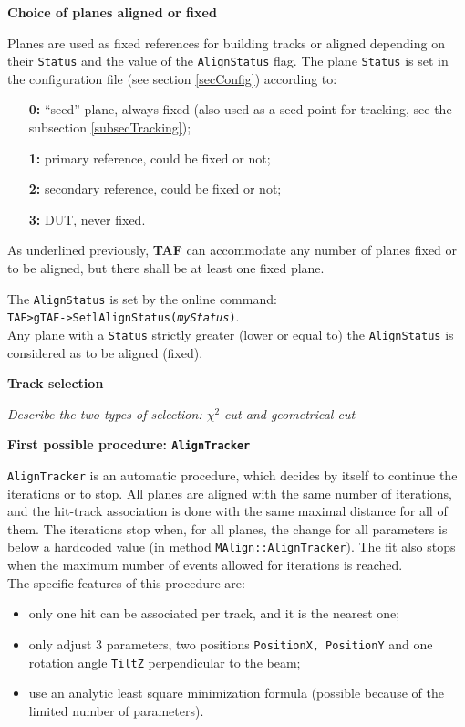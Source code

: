 \documentclass[a4paper, 12pt, twoside]{article}
\newcommand{\TAF}{{\bf TAF }}
\begin{document}
\vspace{0.8 cm}

\noindent
{\bf Choice of planes aligned or fixed}

\noindent
Planes are used as fixed references for building tracks or aligned depending on their {\tt Status} and the value of the {\tt AlignStatus} flag. The plane {\tt Status} is set in the configuration file (see section \ref{secConfig}) according to:
\begin{itemize}
\item[{\bf 0:}] ``seed'' plane, always fixed (also used as a seed point for tracking, see the subsection \ref{subsecTracking});
\item[{\bf 1:}]  primary reference, could be fixed or not;
\item[{\bf 2:}]  secondary reference, could be fixed or not;
\item[{\bf 3:}]  DUT, never fixed.
\end{itemize}
As underlined previously, \TAF  can accommodate any number of planes fixed or to be aligned, but there shall be at least one fixed plane.

\noindent
The {\tt AlignStatus} is set by the online command:\\
{\tt TAF>gTAF->SetlAlignStatus({\it myStatus})}.\\
Any plane with a {\tt Status} strictly greater (lower or equal to) the {\tt AlignStatus} is considered as to be aligned (fixed).


\vspace{0.8 cm}

\noindent
{\bf Track selection}

{\it Describe the two types of selection: $\chi^{2}$ cut and geometrical cut}
 

\noindent\vspace{0.8 cm}

\noindent
{\bf First possible procedure: {\tt AlignTracker}}

\noindent
{\tt AlignTracker} is an automatic procedure, which decides by itself to continue the iterations or to stop. All planes are aligned with the same number of iterations, and the hit-track association is done with the same maximal distance for all of them. The iterations stop when, for all planes, the change for all parameters is below a hardcoded value (in method {\tt MAlign::AlignTracker}). The fit also stops when the maximum number of events allowed for iterations is reached.\\
The specific features of this procedure are:
\begin{itemize}
\item only one hit can be associated per track, and it is the nearest one;
\item only adjust 3 parameters, two positions {\tt PositionX, PositionY} and one rotation angle {\tt TiltZ} perpendicular to the beam;
\item use an analytic least square minimization formula (possible because of the limited number of parameters).
\end{itemize}
\end{document}

